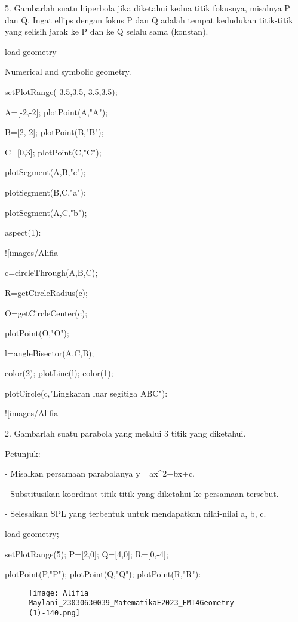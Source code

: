 \documentclass{article}
\begin{document}
5. Gambarlah suatu hiperbola jika diketahui kedua titik fokusnya, misalnya P dan Q. Ingat
ellips dengan fokus P dan Q adalah tempat kedudukan titik-titik yang selisih jarak ke P dan
ke Q selalu sama (konstan).


\>load geometry


    Numerical and symbolic geometry.

\>setPlotRange(-3.5,3.5,-3.5,3.5);

\>A=[-2,-2]; plotPoint(A,"A");

\>B=[2,-2]; plotPoint(B,"B");

\>C=[0,3]; plotPoint(C,"C");

\>plotSegment(A,B,"c");

\>plotSegment(B,C,"a");

\>plotSegment(A,C,"b");

\>aspect(1):


![images/Alifia%

\>c=circleThrough(A,B,C);

\>R=getCircleRadius(c);

\>O=getCircleCenter(c);

\>plotPoint(O,"O");

\>l=angleBisector(A,C,B);

\>color(2); plotLine(l); color(1);

\>plotCircle(c,"Lingkaran luar segitiga ABC"):


![images/Alifia%

2. Gambarlah suatu parabola yang melalui 3 titik yang diketahui.


Petunjuk:


- Misalkan persamaan parabolanya y= ax^2+bx+c.


- Substitusikan koordinat titik-titik yang diketahui ke persamaan
tersebut.


- Selesaikan SPL yang terbentuk untuk mendapatkan nilai-nilai a, b, c.


\>load geometry;

\>setPlotRange(5); P=[2,0]; Q=[4,0]; R=[0,-4];

\>plotPoint(P,"P"); plotPoint(Q,"Q"); plotPoint(R,"R"):


\begin{figure}
    \centering
    \texttt{[image: Alifia Maylani\_23030630039\_MatematikaE2023\_EMT4Geometry (1)-140.png]}
    \caption{}
    \label{fig:enter-label}
\end{figure}
\end{document}
